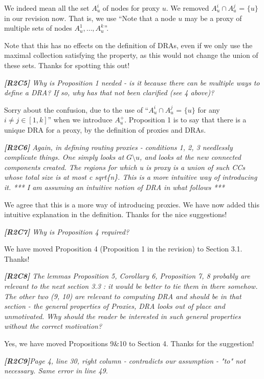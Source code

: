 \documentclass[11pt]{letter}
\newcommand{\vs}{\vspace{1ex}}
\newcommand{\svs}{\vspace{0.36ex}}
\begin{document}
We indeed mean all the set $A_u^i$ of nodes for proxy $u$. We removed $A^i_u\cap A^j_u$ = $\{u\}$ in our revision now.
%
That is, we use ``Note that a node $u$ may be a proxy of multiple sets of nodes $A^1_u, \ldots, A^k_u$''.

Note that this has no effects on the definition of DRAs, even if we only use the maximal collection satisfying the property, as this would not change the union of these sets. Thanks for spotting this out!

\vs
\noindent
{\em{\bf[R2C5]} Why is Proposition 1 needed - is it because there can be multiple ways to define a DRA? If so, why has that not been clarified (see 4 above)?}
\svs

Sorry about the confusion, due to the use of ``$A^i_u\cap A^j_u$ = $\{u\}$ for any $i\ne j\in[1, k]$'' when we introduce $A_u^+$.
 Proposition 1 is to say that there is a unique DRA for a proxy, by the definition of proxies and DRAs.


\vs
\noindent
{\em{\bf[R2C6]} Again, in defining routing proxies - conditions 1, 2, 3 needlessly
complicate things. One simply looks at $G \setminus u$, and looks at the
new connected components created. The regions for which u is proxy
is a union of such CCs whose total size is at most c sqrt\{n\}. This
is a more intuitive way of introducing it.
*** I am assuming an intuitive notion of DRA in what follows ***
}
\svs

We agree that this is a more  way of introducing proxies.  We have now added this intuitive explanation in the definition. Thanks for the nice suggestions!



\vs
\noindent
{\em{\bf[R2C7]} Why is Proposition 4 required?}
\svs

We have moved Proposition 4 (Proposition 1 in the revision) to Section 3.1. Thanks!

\vs
\noindent
{\em{\bf[R2C8]} The lemmas Proposition 5, Corollary 6, Proposition 7, 8 probably
are relevant to the next section 3.3 : it would be better to tie them
in there somehow. The other two (9, 10) are relevant to computing DRA
and should be in that section - the general properties of Proxies, DRA
looks out of place and unmotivated. Why should the reader be
interested
in such general properties without the correct motivation?
}

\svs
Yes, we have moved Propositions 9\&10 to Section 4. Thanks for the suggestion!

\vs
\noindent
{\em{\bf[R2C9]}Page 4, line 30, right column - contradicts our assumption - "to" not necessary. Same error in line 49.}
\svs
\end{document}
